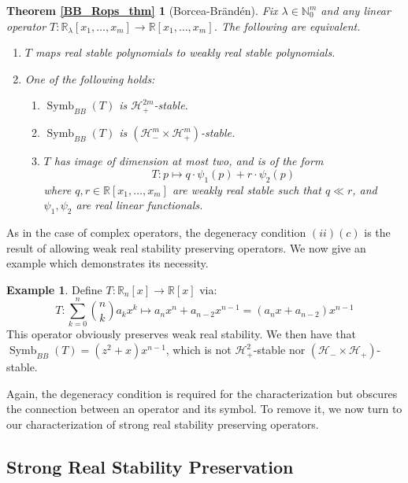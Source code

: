 \documentclass{article}
\theoremstyle{definition}
\newtheorem{example}[theorem]{Example}
\theoremstyle{plain}
\newcommand{\R}{\mathbb{R}}
\newcommand{\N}{\mathbb{N}}
\newcommand{\UHP}{\mathcal{H}_+}
\newcommand{\LHP}{\mathcal{H}_-}
\DeclareMathOperator{\Symb}{Symb}
\begin{document}
\newtheorem*{BB_Rops_thm}{Theorem \ref{BB_Rops_thm}}
\begin{BB_Rops_thm}[Borcea-Br{\"a}nd{\'e}n]
    Fix $\lambda \in \N_0^m$ and any linear operator $T: \R_\lambda[x_1,\ldots,x_m] \to \R[x_1,\ldots,x_m]$. The following are equivalent.
    \begin{enumerate}[label=(\roman*)]
        \item $T$ maps real stable polynomials to weakly real stable polynomials.
        \item One of the following holds:
            \begin{enumerate}[label=(\alph*)]
                \item $\Symb_{BB}(T)$ is $\UHP^{2m}$-stable.
                \item $\Symb_{BB}(T)$ is $(\LHP^m \times \UHP^m)$-stable.
                \item $T$ has image of dimension at most two, and is of the form
                \[
                    T: p \mapsto q \cdot \psi_1(p) + r \cdot \psi_2(p)
                \]
                where $q,r \in \R[x_1,\ldots,x_m]$ are weakly real stable such that $q \ll r$, and $\psi_1,\psi_2$ are real linear functionals.
            \end{enumerate}
    \end{enumerate}
\end{BB_Rops_thm}

As in the case of complex operators, the degeneracy condition $(ii)(c)$ is the result of allowing weak real stability preserving operators. We now give an example which demonstrates its necessity.

\begin{example}
    Define $T: \R_n[x] \to \R[x]$ via:
    \[
        T: \sum_{k=0}^n \binom{n}{k} a_k x^k \mapsto a_nx^n + a_{n-2}x^{n-1} = (a_nx + a_{n-2})x^{n-1}
    \]
    This operator obviously preserves weak real stability. We then have that $\Symb_{BB}(T) = (z^2+x)x^{n-1}$, which is not $\UHP^2$-stable nor $(\LHP \times \UHP)$-stable.
\end{example}

Again, the degeneracy condition is required for the characterization but obscures the connection between an operator and its symbol. To remove it, we now turn to our characterization of strong real stability preserving operators.

\subsection{Strong Real Stability Preservation}
\end{document}
